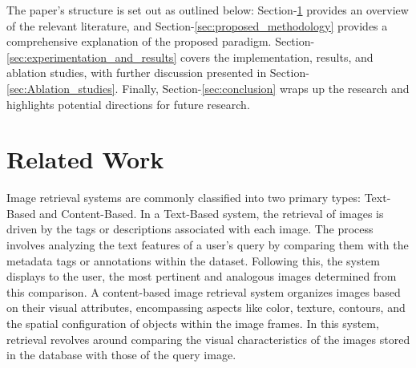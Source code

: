 \documentclass[10pt,lineno]{wlpeerj}
\begin{document}
\par The paper's structure is set out as outlined below: Section-\ref{sec:LR} provides an overview of the relevant literature, and Section-\ref{sec:proposed_methodology} provides a comprehensive explanation of the proposed paradigm. Section-\ref{sec:experimentation_and_results} covers the implementation, results, and ablation studies, with further discussion presented in Section-\ref{sec:Ablation_studies}. Finally, Section-\ref{sec:conclusion} wraps up the research and highlights potential directions for future research.

\section{Related Work}\label{sec:LR}
\par Image retrieval systems are commonly classified into two primary types: Text-Based and Content-Based. In a Text-Based system, the retrieval of images is driven by the tags or descriptions associated with each image. The process involves analyzing the text features of a user's query by comparing them with the metadata tags or annotations within the dataset. Following this, the system displays to the user, the most pertinent and analogous images determined from this comparison. A content-based image retrieval system organizes images based on their visual attributes, encompassing aspects like color, texture, contours, and the spatial configuration of objects within the image frames. In this system, retrieval revolves around comparing the visual characteristics of the images stored in the database with those of the query image.
\end{document}
